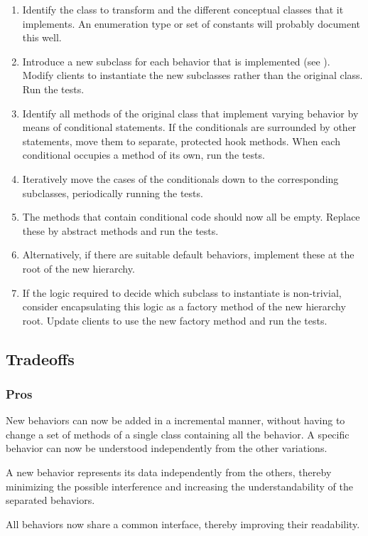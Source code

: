 \documentclass[a4paper,10pt,twoside]{book}
\begin{document}
\begin{enumerate}
  \item Identify the class to transform and the different conceptual classes that it implements. An enumeration type or set of constants will probably document this well.

  \item Introduce a new subclass for each behavior that is implemented (see ). Modify clients to instantiate the new subclasses rather than the original class. Run the tests.

  \item Identify all methods of the original class that implement varying behavior by means of conditional statements. If the conditionals are surrounded by other statements, move them to separate, protected hook methods. When each conditional occupies a method of its own, run the tests.

  \item Iteratively move the cases of the conditionals down to the corresponding subclasses, periodically running the tests.

  \item The methods that contain conditional code should now all be empty. Replace these by abstract methods and run the tests.

  \item Alternatively, if there are suitable default behaviors, implement these at the root of the new hierarchy.

  \item If the logic required to decide which subclass to instantiate is non-trivial, consider encapsulating this logic as a factory method of the new hierarchy root. Update clients to use the new factory method and run the tests.
\end{enumerate}

\subsection*{Tradeoffs}

\subsubsection*{Pros}

\begin{bulletlist}
\item New behaviors can now be added in a incremental manner, without having to change a set of methods of a single class containing all the behavior. A specific behavior can now be understood independently from the other variations. 

\item A new behavior represents its data independently from the others, thereby minimizing the possible interference and increasing the understandability of the separated behaviors. 

\item All behaviors now share a common interface, thereby improving their readability.
\end{bulletlist}
\end{document}
